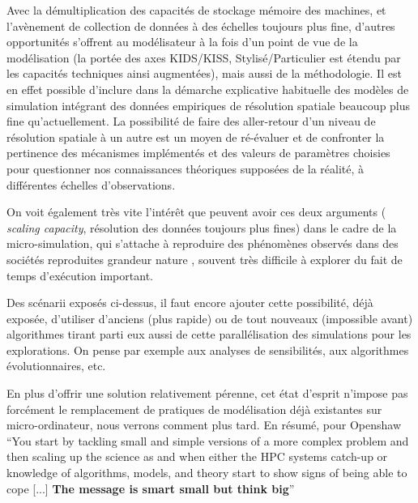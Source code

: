 Avec la démultiplication des capacités de stockage mémoire des machines, et l'avènement de collection de données à des échelles toujours plus fine, d'autres opportunités s'offrent au modélisateur à la fois d'un point de vue de la modélisation (la portée des axes KIDS/KISS, Stylisé/Particulier \autocite{Banos2013a} est étendu par les capacités techniques ainsi augmentées), mais aussi de la méthodologie. Il est en effet possible d'inclure dans la démarche explicative habituelle des modèles de simulation intégrant des données empiriques de résolution spatiale beaucoup plus fine qu'actuellement. La possibilité de faire des aller-retour d'un niveau de résolution spatiale à un autre est un moyen de ré-évaluer et de confronter la pertinence des mécanismes implémentés et des valeurs de paramètres choisies pour questionner nos connaissances théoriques supposées de la réalité, à différentes échelles d'observations.

On voit également très vite l'intérêt que peuvent avoir ces deux arguments ( \textit{scaling capacity}, résolution des données toujours plus fines) dans le cadre de la micro-simulation, qui s'attache à reproduire des phénomènes observés dans des sociétés reproduites grandeur nature \autocite{Sanders2006}, souvent très difficile à explorer du fait de temps d'exécution important.

Des scénarii exposés ci-dessus, il faut encore ajouter cette possibilité, déjà exposée, d'utiliser d'anciens (plus rapide) ou de tout nouveaux (impossible avant) algorithmes tirant parti eux aussi de cette parallélisation des simulations pour les explorations. On pense par exemple aux analyses de sensibilités, aux algorithmes évolutionnaires, etc.

En plus d'offrir une solution relativement pérenne, cet état d'esprit n'impose pas forcément le remplacement de pratiques de modélisation déjà existantes sur micro-ordinateur, nous verrons comment plus tard. En résumé, pour Openshaw \foreignquote{english}{You start by tackling small and simple versions of a more complex problem and then scaling up the science as and when either the HPC systems catch-up or knowledge of algorithms, models, and theory start to show signs of being able to cope [...] \textbf{The message is smart small but think big}}

